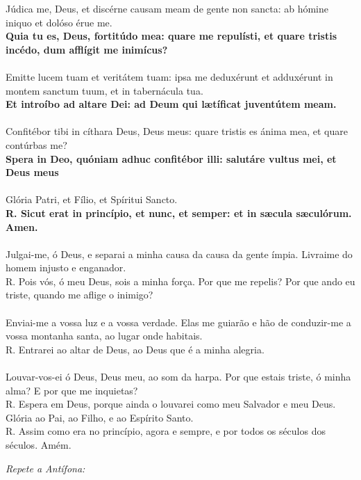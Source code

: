 \begin{multicols}{2}
\noindent Júdica me, Deus, et discérne causam meam de gente non sancta: ab hómine iniquo et dolóso érue me. 
\\ \textbf{Quia tu es, Deus, fortitúdo mea: quare me repulísti, et quare tristis incédo, dum afflígit me inimícus?}
\\
\\Emitte lucem tuam et veritátem tuam: ipsa me deduxérunt et adduxérunt in montem sanctum tuum, et in tabernácula tua. 
\\ \textbf{Et introíbo ad altare Dei: ad Deum qui lætíficat juventútem meam.}
\\
\\ Confitébor tibi in cíthara Deus, Deus meus: quare tristis es ánima mea, et quare contúrbas me? 
\\ \textbf{Spera in Deo, quóniam adhuc confitébor illi: salutáre vultus mei, et Deus meus}
\\
\\ Glória Patri, et Fílio, et Spíritui Sancto. 
\\ \textbf{R. Sicut erat in princípio, et nunc, et semper: et in sæcula sæculórum. Amen.}
\\
\\ Julgai-me, ó Deus, e separai a minha causa da causa da gente ímpia. Livraime do homem injusto e enganador. 
\\ R. Pois vós, ó meu Deus, sois a minha força. Por que me repelis? Por que ando eu triste, quando me aflige o inimigo? 
\\
\\ Enviai-me a vossa luz e a vossa verdade. Elas me guiarão e hão de conduzir-me a vossa montanha santa, ao lugar onde habitais. 
\\ R. Entrarei ao altar de Deus, ao Deus que é a minha alegria.
\\ 
\\ Louvar-vos-ei ó Deus, Deus meu, ao som da harpa. Por que estais triste, ó minha alma? E por que me inquietas?
\\ R. Espera em Deus, porque ainda o louvarei como meu Salvador e meu Deus.
\\ Glória ao Pai, ao Filho, e ao Espírito Santo. 
\\ R. Assim como era no princípio, agora e sempre, e por todos os séculos dos séculos. Amém.


\end{multicols}

\noindent \textit{Repete a Antífona:}

